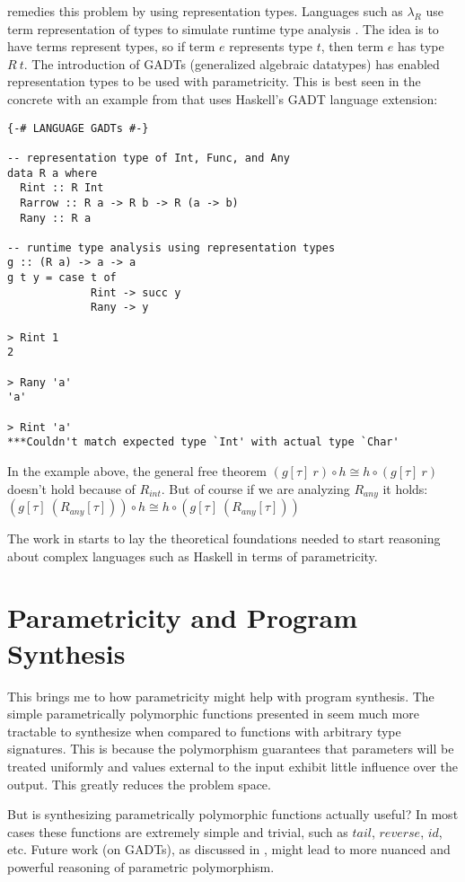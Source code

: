 \cite{vytinFree} remedies this problem by using representation types. Languages such as $\lambda_R $ use term representation of types to simulate runtime type analysis \cite{erasureSemantics}. The idea is to have terms represent types, so if term $e$ represents type $t$, then term $e$ has type $R\ t$. The introduction of GADTs (generalized algebraic datatypes) has enabled representation types to be used with parametricity. This is best seen in the concrete with an example from \cite{vytinFree} that uses Haskell's GADT language extension:
\begin{verbatim}
{-# LANGUAGE GADTs #-}

-- representation type of Int, Func, and Any
data R a where
  Rint :: R Int
  Rarrow :: R a -> R b -> R (a -> b)
  Rany :: R a

-- runtime type analysis using representation types
g :: (R a) -> a -> a
g t y = case t of
             Rint -> succ y
             Rany -> y

> Rint 1
2

> Rany 'a'
'a'

> Rint 'a'
***Couldn't match expected type `Int' with actual type `Char'
\end{verbatim}

In the example above, the general free theorem $(g[\tau]\ r) \circ h \cong h \circ (g[\tau]\ r) $ doesn't hold because of $R_{int} $. But of course if we are analyzing $R_{any} $ it holds: $(g[\tau]\ (R_{any}[\tau])) \circ h \cong h \circ (g[\tau]\ (R_{any}[\tau])) $ \cite{vytinFree}

The work in \cite{vytinFree} starts to lay the theoretical foundations needed to start reasoning about complex languages such as Haskell in terms of parametricity.

\section{Parametricity and Program Synthesis}
This brings me to how parametricity might help with program synthesis. The simple parametrically polymorphic functions presented in \cite{theoremsForFree} seem much more tractable to synthesize when compared to functions with arbitrary type signatures. This is because the polymorphism guarantees that parameters will be treated uniformly and values external to the input exhibit little influence over the output. This greatly reduces the problem space.

But is synthesizing parametrically polymorphic functions actually useful? In most cases these functions are extremely simple and trivial, such as $tail$, $reverse$, $id$, etc. Future work (on GADTs), as discussed in \cite{vytinFree}, might lead to more nuanced and powerful reasoning of parametric polymorphism.

